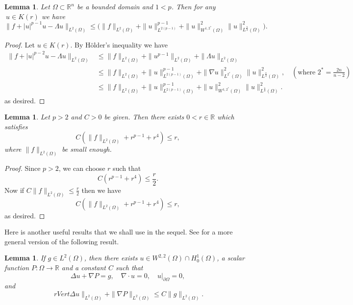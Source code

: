 \documentclass[10pt,a4paper]{amsart}
\numberwithin{equation}{section}
\newtheorem{lemma}[theorem]{Lemma}
\begin{document}
\begin{lemma}\label{C1C2}
 Let \(\Omega \subset \mathbb{R}^n \) be a bounded domain and \( 1<p\).
Then for any $\ u\in K(r) $ we have
\[
\big\rVert f+|u|^{p-1}u-\Lambda u\big\rVert_{L^2(\Omega)}
\leq \big( \rVert f\rVert_{L^2(\Omega)}
+\rVert u\rVert^{p-1}_{L^{2(p-1)}}+\rVert {u}\rVert^{2}_{W^{1,2^*}(\Omega)}
\rVert  {u}\rVert^2_{L^{\frac{n}{2}}(\Omega)} \big).
\]
\end{lemma}

\begin{proof}
Let \(u \in K(r)\). By H\"older's inequality we have
\begin{align*}
     \big\rVert f+|u|^{p-2}u-\Lambda u\big\rVert_{L^2(\Omega)}
     &\leq \rVert f\rVert_{L^2(\Omega)}+\rVert u^{p-1}\rVert_{L^2(\Omega)}
     +\rVert \Lambda u\rVert_{L^2(\Omega)}\\
     &\leq \rVert f\rVert_{L^2(\Omega)}+\rVert u\rVert^{p-1}_{L^{2(p-1)}(\Omega)}
     +\rVert \nabla u\rVert^2_{L^{2^*}(\Omega)}
     \rVert  u\rVert^2_{L^{\frac{n}{2}}(\Omega)}, \quad (\text{where }2^*=\frac{2n}{n-2})\\
     &\leq \rVert f\rVert_{L^2(\Omega)}+\rVert u\rVert^{p-1}_{L^{2(p-1)}(\Omega)}
     +\rVert  u\rVert^2_{W^{1,2^*}(\Omega)}\rVert  u\rVert^2_{L^{\frac{n}{2}}(\Omega)}.
\end{align*}
as desired.
\end{proof}

\begin{lemma}\label{rbar}
Let \( p>2 \) and \(C>0\) be given. Then there exists \(0<{r}\in \mathbb{R}\) which satisfies
 \[ C (\rVert f\rVert_{L^2(\Omega)} +{r}^{p-1}+{r}^4)\leq {r},\]
 where \(\rVert f\rVert_{L^2(\Omega)}\) be small enough.
\end{lemma}

\begin{proof} Since \(p >2\), we can choose \({r}\) such that
\[
C( {r}^{p-1}+ {r}^4)\leq \frac{{r}}{2}.
\]
Now if \(C\rVert f\rVert_{L^2(\Omega)}\leq \frac{{r}}{2}\) then we have
\[
C (\rVert f\rVert_{L^2(\Omega)} +{r}^{p-1}+{r}^4)\leq {r},
\]
as desired.
\end{proof}

Here is another useful results that we shall use in the sequel.
See \cite[Theorem 1.2]{RH} for a more general version of the following result.

\begin{lemma}\label{nabla lem}
If \(g\in L^2(\Omega)\), then there exists  \(u \in W^{2,2}(\Omega)\cap H_0^1(\Omega)\),
a scalar function \(P : \Omega \to\mathbb{R}\)  and a constant \( C\) such that
 \[
\Delta u + \nabla P = g, \quad  \nabla\cdot u=0,\quad  u|_{\partial \Omega}=0,
\]
and
\[\
rVert \Delta u \rVert_{L^2(\Omega)}+\rVert \nabla P \rVert_{L^2(\Omega)}
\leq C\rVert g \rVert_{L^2(\Omega)}.
\]
\end{lemma}
\end{document}
